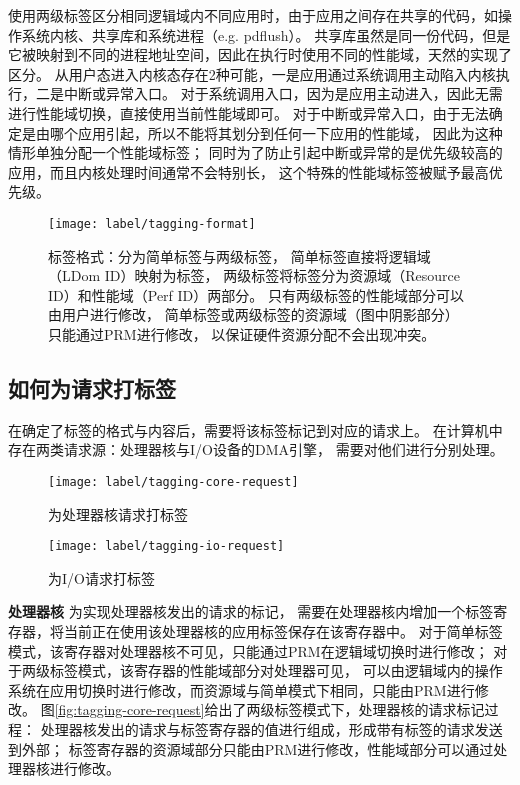 使用两级标签区分相同逻辑域内不同应用时，由于应用之间存在共享的代码，如操作系统内核、共享库和系统进程（e.g. pdflush）。
共享库虽然是同一份代码，但是它被映射到不同的进程地址空间，因此在执行时使用不同的性能域，天然的实现了区分。
从用户态进入内核态存在2种可能，一是应用通过系统调用主动陷入内核执行，二是中断或异常入口。
对于系统调用入口，因为是应用主动进入，因此无需进行性能域切换，直接使用当前性能域即可。
对于中断或异常入口，由于无法确定是由哪个应用引起，所以不能将其划分到任何一下应用的性能域，
因此为这种情形单独分配一个性能域标签；
同时为了防止引起中断或异常的是优先级较高的应用，而且内核处理时间通常不会特别长，
这个特殊的性能域标签被赋予最高优先级。


\begin{figure}[htb]
  \centering
  \texttt{[image: label/tagging-format]}
  \caption[标签格式]{标签格式：分为简单标签与两级标签，
    简单标签直接将逻辑域（LDom ID）映射为标签，
    两级标签将标签分为资源域（Resource ID）和性能域（Perf ID）两部分。
    只有两级标签的性能域部分可以由用户进行修改，
    简单标签或两级标签的资源域（图中阴影部分）只能通过PRM进行修改，
    以保证硬件资源分配不会出现冲突。}
  \label{fig:tagging-format}
\end{figure}

\subsection{如何为请求打标签}
\label{chap:labeladdrspace:tagging}
在确定了标签的格式与内容后，需要将该标签标记到对应的请求上。
在计算机中存在两类请求源：处理器核与I/O设备的DMA引擎，
需要对他们进行分别处理。

\begin{figure}[tb]
\begin{minipage}{0.48\textwidth}
  \centering
  \texttt{[image: label/tagging-core-request]}
  \caption{为处理器核请求打标签}
  \label{fig:tagging-core-request}
\end{minipage}\hfill
\begin{minipage}{0.48\textwidth}
  \centering
  \texttt{[image: label/tagging-io-request]}
  \caption{为I/O请求打标签}
  \label{fig:tagging-io-request}
\end{minipage}
\end{figure}

\textbf{处理器核}\quad
为实现处理器核发出的请求的标记，
需要在处理器核内增加一个标签寄存器，将当前正在使用该处理器核的应用标签保存在该寄存器中。
对于简单标签模式，该寄存器对处理器核不可见，只能通过PRM在逻辑域切换时进行修改；
对于两级标签模式，该寄存器的性能域部分对处理器可见，
可以由逻辑域内的操作系统在应用切换时进行修改，而资源域与简单模式下相同，只能由PRM进行修改。
图\ref{fig:tagging-core-request}给出了两级标签模式下，处理器核的请求标记过程：
处理器核发出的请求与标签寄存器的值进行组成，形成带有标签的请求发送到外部；
标签寄存器的资源域部分只能由PRM进行修改，性能域部分可以通过处理器核进行修改。

